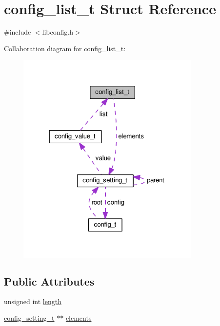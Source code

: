 \hypertarget{structconfig__list__t}{\section{config\-\_\-list\-\_\-t Struct Reference}
\label{structconfig__list__t}
}


{\ttfamily \#include $<$libconfig.\-h$>$}



Collaboration diagram for config\-\_\-list\-\_\-t\-:\nopagebreak
\begin{figure}[H]
\begin{center}
\leavevmode
\includegraphics[width=258pt]{structconfig__list__t__coll__graph}
\end{center}
\end{figure}
\subsection*{Public Attributes}
\begin{DoxyCompactItemize}
\item 
unsigned int \hyperlink{structconfig__list__t_a713729415280421d146ce4f590e33356}{length}
\item 
\hyperlink{structconfig__setting__t}{config\-\_\-setting\-\_\-t} $\ast$$\ast$ \hyperlink{structconfig__list__t_a8a0f0c428590f6630367748c0170c1ea}{elements}
\end{DoxyCompactItemize}


